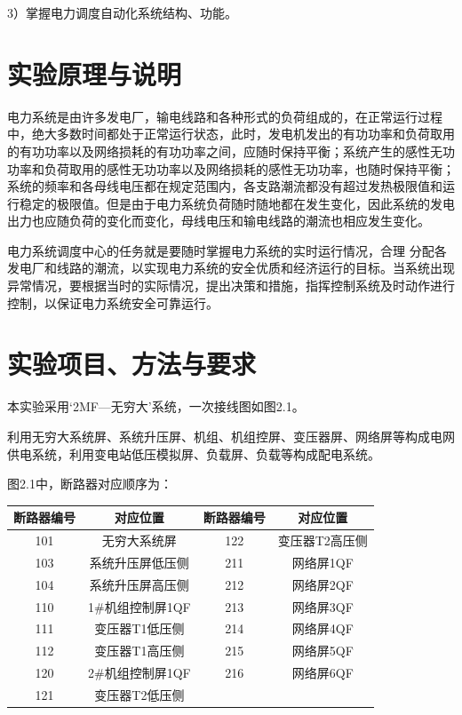 \documentclass[a4paper]{ctexrep}
\begin{document}
                3）掌握电力调度自动化系统结构、功能。
            
            \section{实验原理与说明}
                电力系统是由许多发电厂，输电线路和各种形式的负荷组成的，在正常运行过程中，绝大多数时间都处于正常运行状态，此时，发电机发出的有功功率和负荷取用的有功功率以及网络损耗的有功功率之间，应随时保持平衡；系统产生的感性无功功率和负荷取用的感性无功功率以及网络损耗的感性无功功率，也随时保持平衡；系统的频率和各母线电压都在规定范围内，各支路潮流都没有超过发热极限值和运行稳定的极限值。但是由于电力系统负荷随时随地都在发生变化，因此系统的发电出力也应随负荷的变化而变化，母线电压和输电线路的潮流也相应发生变化。
                
                电力系统调度中心的任务就是要随时掌握电力系统的实时运行情况，合理 分配各发电厂和线路的潮流，以实现电力系统的安全优质和经济运行的目标。当系统出现异常情况，要根据当时的实际情况，提出决策和措施，指挥控制系统及时动作进行控制，以保证电力系统安全可靠运行。

            \section{实验项目、方法与要求}
                本实验采用‘2MF—无穷大’系统，一次接线图如图2.1。
                
                利用无穷大系统屏、系统升压屏、机组、机组控屏、变压器屏、网络屏等构成电网供电系统，利用变电站低压模拟屏、负载屏、负载等构成配电系统。
                
                图2.1中，断路器对应顺序为：
                
                \begin{center}
                    \begin{tabular}{|c|c|c|c|}
                        \hline
                        断路器编号 & 对应位置 & 断路器编号 & 对应位置 \\ \hline
                        101 & 无穷大系统屏 & 122 & 变压器T2高压侧 \\ \hline
                        103 & 系统升压屏低压侧  & 211 & 网络屏1QF \\ \hline
                        104 & 系统升压屏高压侧 & 212 & 网络屏2QF \\ \hline
                        110 & 1\#机组控制屏1QF & 213 & 网络屏3QF \\ \hline
                        111 & 变压器T1低压侧 & 214 & 网络屏4QF \\ \hline
                        112 & 变压器T1高压侧 & 215 & 网络屏5QF \\ \hline
                        120 & 2\#机组控制屏1QF & 216 & 网络屏6QF \\ \hline
                        121 & 变压器T2低压侧 & & \\
                        \hline
                    \end{tabular}
                \end{center}
\end{document}
